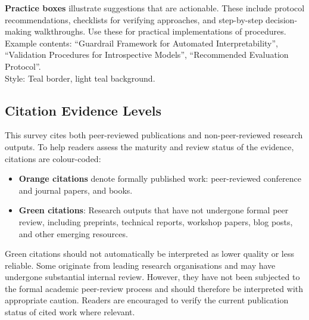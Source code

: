 \begin{practicebox}
\textbf{Practice boxes} illustrate suggestions that are actionable. These include protocol recommendations, checklists for verifying approaches, and step-by-step decision-making walkthroughs. Use these for practical implementations of procedures.\\

Example contents: ``Guardrail Framework for Automated Interpretability'', ``Validation Procedures for Introspective Models'', ``Recommended Evaluation Protocol''.\\

Style: Teal border, light teal background.
\end{practicebox}

\subsection{Citation Evidence Levels}
\label{app:citation-colors}

This survey cites both peer-reviewed publications and non-peer-reviewed research outputs. To help readers assess the maturity and review status of the evidence, citations are colour-coded:

\begin{itemize}
    \item \textcolor{citeestablished}{\textbf{Orange citations}} denote formally
    published work: peer-reviewed conference and journal papers, and books.

    \item \textcolor{citeemerging}{\textbf{Green citations}}: Research outputs that have not undergone formal peer review, including preprints, technical reports, workshop papers, blog posts, and other emerging resources.
\end{itemize}

Green citations should not automatically be interpreted as lower quality or less reliable. Some originate from leading research organisations and may have undergone substantial internal review. However, they have not been subjected to the formal academic peer-review process and should therefore be interpreted with appropriate caution. Readers are encouraged to verify the current publication status of cited work where relevant.


